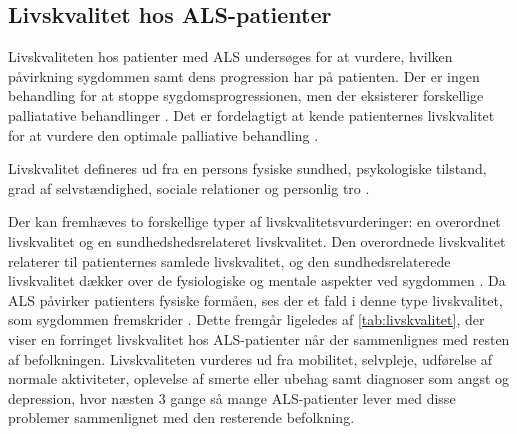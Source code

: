 \subsection{Livskvalitet hos ALS-patienter}
Livskvaliteten hos patienter med ALS undersøges for at vurdere, hvilken påvirkning sygdommen samt dens progression har på patienten. Der er ingen behandling for at stoppe sygdomsprogressionen, men der eksisterer forskellige palliatative behandlinger \citep{neudert2004}. Det er fordelagtigt at kende patienternes livskvalitet for at vurdere den optimale palliative behandling \citep{ilse2015}.

Livskvalitet defineres ud fra en persons fysiske sundhed, psykologiske tilstand, grad af selvstændighed, sociale relationer og personlig tro \citep{pagnini2013}.

Der kan fremhæves to forskellige typer af livskvalitetsvurderinger: en overordnet livskvalitet og en sundhedshedsrelateret livskvalitet. 
Den overordnede livskvalitet relaterer til patienternes samlede livskvalitet, og den sundhedsrelaterede livskvalitet dækker over de fysiologiske og mentale aspekter ved sygdommen \citep{ilse2015, nuedert2004}. Da ALS påvirker patienters fysiske formåen, ses der et fald i denne type livskvalitet, som sygdommen fremskrider \citep{ilse2015}. Dette fremgår ligeledes af \autoref{tab:livskvalitet}, der viser en forringet livskvalitet hos ALS-patienter når der sammenlignes med resten af befolkningen. Livskvaliteten vurderes ud fra mobilitet, selvpleje, udførelse af normale aktiviteter, oplevelse af smerte eller ubehag samt diagnoser som angst og depression, hvor næsten 3 gange så mange ALS-patienter lever med disse problemer sammenlignet med den resterende befolkning.

